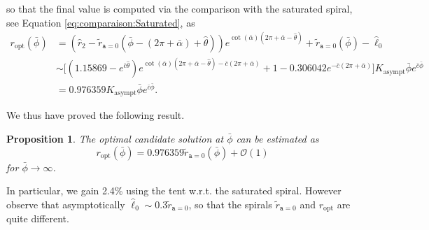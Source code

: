 \documentclass[reqno]{amsart}
\theoremstyle{definition} \newtheorem{definition}{Definition}[section]
\theoremstyle{definition} \newtheorem{remark}[definition]{Remark}
\theoremstyle{plain} \newtheorem{lemma}[definition]{Lemma}
\theoremstyle{plain} \newtheorem{proposition}[definition]{Proposition}
\theoremstyle{plain} \newtheorem{theorem}[definition]{Theorem}
\theoremstyle{plain} \newtheorem{corollary}[definition]{Corollary}
\theoremstyle{definition} \newtheorem{example}[definition]{Example}
\theoremstyle{plain} \newtheorem{claim}[clai]{Claim}
\theoremstyle{definition} \newtheorem{assumption}[definition]{Assumption}
\theoremstyle{definition} \newtheorem{observation}[definition]{Observation}
\newcommand{\1}{\mathbbm 1}
\numberwithin{equation}{section} %
\theoremstyle{plain} \newtheorem*{theorem*}{Theorem}
\theoremstyle{plain} \newtheorem{mthm}[maintheorem]{Main Theorem}
\theoremstyle{plain} \newtheorem*{mthm*}{Main Theorem}
\theoremstyle{plain} \newtheorem*{conjecture*}{Conjecture}
\theoremstyle{plain} \newtheorem{conjecture}[definition]{Conjecture}
\theoremstyle{plain} \newtheorem*{problem*}{Problem}
\begin{document}
so that the final value is computed via the comparison with the saturated spiral, see Equation \eqref{eq:comparaison:Saturated}, as
\begin{align*}
r_\mathrm{opt}(\bar \phi) &= (\hat r_2 - \tilde r_{\mathtt a = 0}(\bar \phi - (2\pi + \bar \alpha) + \hat \theta)) e^{\cot(\bar \alpha)(2\pi + \bar \alpha - \hat \theta)} + \tilde r_{\mathtt a = 0}(\bar \phi) - \hat \ell_0 \\
&\sim \big[ (1.15869 - e^{\bar c \hat \theta}) e^{\cot(\bar \alpha)(2 \pi + \bar \alpha - \hat \theta) - \bar c(2\pi + \bar \alpha)} + 1 - 0.306042 e^{- \bar c (2\pi + \bar \alpha)} \big] K_\mathrm{asympt} \bar \phi e^{\bar c \bar \phi} \\
&= 0.976359 K_\mathrm{asympt} \bar \phi e^{\bar c \bar \phi}.
\end{align*}

We thus have proved the following result.

\begin{proposition}
\label{Prop:postiv_aympt}
The optimal candidate solution at $\bar \phi$ can be estimated as %
\begin{equation*}
r_\mathrm{opt}(\bar \phi) = 0.976359 \tilde r_{\mathtt a = 0}(\bar \phi) + \mathcal O(1)
\end{equation*}
for $\bar \phi \to \infty$.
\end{proposition}

In particular, we gain 2.4\% using the tent w.r.t. the saturated spiral. However observe that asymptotically $\hat\ell_0 \sim 0.3 \tilde r_{\mathtt a = 0}$, so that the spirals $\tilde r_{\mathtt a = 0}$ and $r_\mathrm{opt}$ are quite different.
\end{document}
